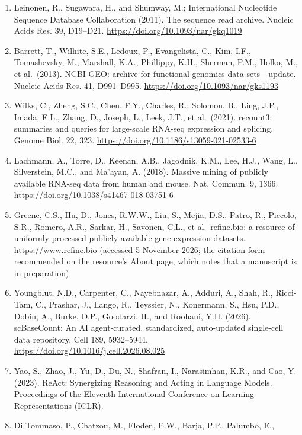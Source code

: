 \documentclass[11pt,a4paper]{article}
\providecommand{\tightlist}{\setlength{\itemsep}{0pt}\setlength{\parskip}{0pt}}
\begin{document}
\begin{enumerate}
\def\labelenumi{\arabic{enumi}.}
\tightlist
\item
  Leinonen, R., Sugawara, H., and Shumway, M.; International Nucleotide
  Sequence Database Collaboration (2011). The sequence read archive.
  Nucleic Acids Res. 39, D19--D21.
  \url{https://doi.org/10.1093/nar/gkq1019}
\item
  Barrett, T., Wilhite, S.E., Ledoux, P., Evangelista, C., Kim, I.F.,
  Tomashevsky, M., Marshall, K.A., Phillippy, K.H., Sherman, P.M.,
  Holko, M., et al.~(2013). NCBI GEO: archive for functional genomics
  data sets---update. Nucleic Acids Res. 41, D991--D995.
  \url{https://doi.org/10.1093/nar/gks1193}
\item
  Wilks, C., Zheng, S.C., Chen, F.Y., Charles, R., Solomon, B., Ling,
  J.P., Imada, E.L., Zhang, D., Joseph, L., Leek, J.T., et al.~(2021).
  recount3: summaries and queries for large-scale RNA-seq expression and
  splicing. Genome Biol. 22, 323.
  \url{https://doi.org/10.1186/s13059-021-02533-6}
\item
  Lachmann, A., Torre, D., Keenan, A.B., Jagodnik, K.M., Lee, H.J.,
  Wang, L., Silverstein, M.C., and Ma'ayan, A. (2018). Massive mining of
  publicly available RNA-seq data from human and mouse. Nat. Commun. 9,
  1366. \url{https://doi.org/10.1038/s41467-018-03751-6}
\item
  Greene, C.S., Hu, D., Jones, R.W.W., Liu, S., Mejia, D.S., Patro, R.,
  Piccolo, S.R., Romero, A.R., Sarkar, H., Savonen, C.L., et
  al.~refine.bio: a resource of uniformly processed publicly available
  gene expression datasets. \url{https://www.refine.bio} (accessed 5
  November 2026; the citation form recommended on the resource's About
  page, which notes that a manuscript is in preparation).
\item
  Youngblut, N.D., Carpenter, C., Nayebnazar, A., Adduri, A., Shah, R.,
  Ricci-Tam, C., Prashar, J., Ilango, R., Teyssier, N., Konermann, S.,
  Hsu, P.D., Dobin, A., Burke, D.P., Goodarzi, H., and Roohani, Y.H.
  (2026). scBaseCount: An AI agent-curated, standardized, auto-updated
  single-cell data repository. Cell 189, 5932--5944.
  \url{https://doi.org/10.1016/j.cell.2026.08.025}
\item
  Yao, S., Zhao, J., Yu, D., Du, N., Shafran, I., Narasimhan, K.R., and
  Cao, Y. (2023). ReAct: Synergizing Reasoning and Acting in Language
  Models. Proceedings of the Eleventh International Conference on
  Learning Representations (ICLR).
\item
  Di Tommaso, P., Chatzou, M., Floden, E.W., Barja, P.P., Palumbo, E.,

\end{enumerate}
\end{document}
